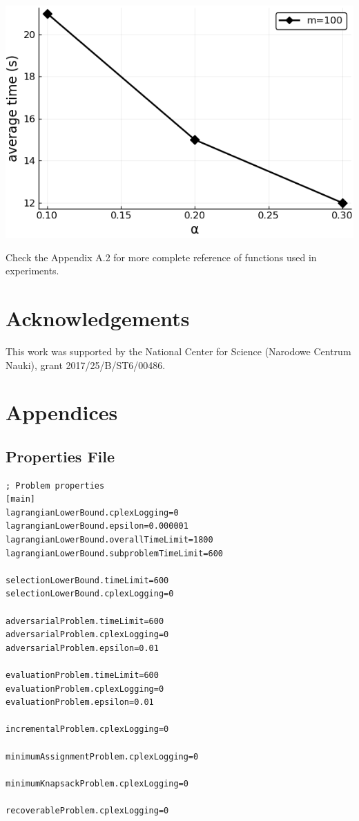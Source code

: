 \includegraphics[width=\textwidth]{plot.png}

Check the Appendix A.2 for more complete reference of functions used in experiments.

\section{Acknowledgements}
This work was supported by the National Center for Science (Narodowe Centrum Nauki), grant 2017/25/B/ST6/00486.

\clearpage
\appendix
\section{Appendices}

\subsection{Properties File}
\label{sec:properties}
\begin{lstlisting}
; Problem properties
[main]
lagrangianLowerBound.cplexLogging=0
lagrangianLowerBound.epsilon=0.000001
lagrangianLowerBound.overallTimeLimit=1800
lagrangianLowerBound.subproblemTimeLimit=600

selectionLowerBound.timeLimit=600
selectionLowerBound.cplexLogging=0

adversarialProblem.timeLimit=600
adversarialProblem.cplexLogging=0
adversarialProblem.epsilon=0.01

evaluationProblem.timeLimit=600
evaluationProblem.cplexLogging=0
evaluationProblem.epsilon=0.01

incrementalProblem.cplexLogging=0

minimumAssignmentProblem.cplexLogging=0

minimumKnapsackProblem.cplexLogging=0

recoverableProblem.cplexLogging=0
\end{lstlisting}
\clearpage

\setcounter{subsection}{+1}


{}



